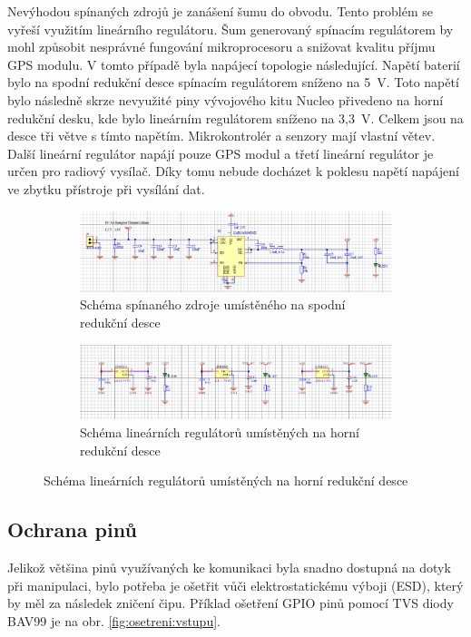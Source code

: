 \documentclass[twoside]{ctuthesis}
\theoremstyle{plain}
\theoremstyle{definition}
\theoremstyle{note}
\begin{document}
			Nevýhodou spínaných zdrojů je zanášení šumu do obvodu. Tento problém se vyřeší využitím lineárního regulátoru. Šum generovaný spínacím regulátorem by mohl způsobit nesprávné fungování mikroprocesoru a snižovat kvalitu příjmu GPS modulu. V tomto případě byla napájecí topologie následující. Napětí baterií bylo na spodní redukční desce spínacím regulátorem sníženo na 5~V. Toto napětí bylo následně skrze nevyužité piny vývojového kitu Nucleo přivedeno na horní redukční desku, kde bylo lineárním regulátorem sníženo na 3{,}3~V. Celkem jsou na desce tři větve s tímto napětím. Mikrokontrolér a senzory mají vlastní větev. Další lineární regulátor napájí pouze GPS modul a třetí lineární regulátor je určen pro radiový vysílač. Díky tomu nebude docházet k poklesu napětí napájení ve zbytku přístroje při vysílání dat. 
			\begin{figure}
				\begin{subfigure}{\textwidth}
					\centering
					\includegraphics[width = \textwidth]{Figures/psu_bot.png}
					\caption{Schéma spínaného zdroje umístěného na spodní redukční desce}
					\label{fig:psu:bot}
				\end{subfigure}
				\begin{subfigure}{\textwidth}
					\centering
					\includegraphics[width = \textwidth]{Figures/psu_top.png}
					\caption{Schéma lineárních regulátorů umístěných na horní redukční desce}
					\label{fig:psu:top}
				\end{subfigure}
			\end{figure}
			


		\subsection{Ochrana pinů}
		Jelikož většina pinů využívaných ke komunikaci byla snadno dostupná na dotyk při manipulaci, bylo potřeba je ošetřit vůči elektrostatickému výboji (ESD), který by měl za následek zničení čipu. Příklad ošetření GPIO pinů pomocí TVS diody BAV99 je na obr. \ref{fig:osetreni:vstupu}.
		
\end{document}
